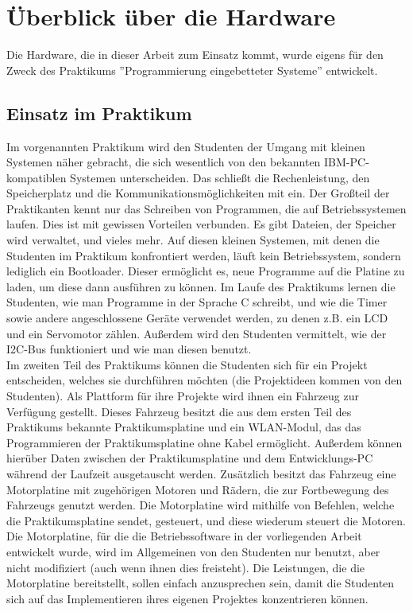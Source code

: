 \chapter{Überblick über die Hardware}
Die Hardware, die in dieser Arbeit zum Einsatz kommt, wurde eigens für den Zweck des Praktikums
''Programmierung eingebetteter Systeme'' entwickelt.

\section{Einsatz im Praktikum}
Im vorgenannten Praktikum wird den Studenten der
Umgang mit kleinen Systemen näher gebracht, die sich wesentlich von den bekannten IBM-PC-kompatiblen
Systemen unterscheiden. Das schließt die Rechenleistung, den Speicherplatz und die
Kommunikationsmöglichkeiten mit ein. 
Der Großteil der Praktikanten kennt nur das Schreiben von Programmen, die auf Betriebssystemen laufen.
Dies ist mit gewissen Vorteilen verbunden. Es gibt
Dateien, der Speicher wird verwaltet, und vieles mehr. Auf diesen kleinen Systemen, mit denen die Studenten im
Praktikum konfrontiert werden, läuft kein Betriebssystem, sondern lediglich ein Bootloader. Dieser
ermöglicht es, neue Programme auf die Platine zu laden, um diese dann ausführen zu können.
Im Laufe des Praktikums lernen die Studenten, wie man Programme in der Sprache C schreibt, und wie die Timer
sowie andere angeschlossene Geräte verwendet werden, zu denen z.B. ein LCD und ein Servomotor zählen.
Außerdem wird den Studenten vermittelt, wie der I2C-Bus funktioniert und wie man diesen benutzt.\\
Im zweiten Teil des Praktikums können die Studenten sich für ein Projekt entscheiden,
welches sie durchführen möchten (die Projektideen kommen von den Studenten).
Als Plattform für ihre Projekte wird ihnen ein Fahrzeug zur Verfügung gestellt. Dieses
Fahrzeug besitzt die aus dem ersten Teil des Praktikums bekannte Praktikumsplatine und ein WLAN-Modul,
das das Programmieren der Praktikumsplatine
ohne Kabel ermöglicht. Außerdem können hierüber Daten zwischen der Praktikumsplatine
und dem Entwicklungs-PC während
der Laufzeit ausgetauscht werden. Zusätzlich besitzt das Fahrzeug eine Motorplatine mit
zugehörigen Motoren und Rädern, die zur Fortbewegung des Fahrzeugs genutzt werden. Die
Motorplatine wird mithilfe von Befehlen, welche die Praktikumsplatine sendet, gesteuert, und
diese wiederum steuert die Motoren.\\
Die Motorplatine, für die die Betriebssoftware in der vorliegenden Arbeit entwickelt wurde, wird
im Allgemeinen von den Studenten nur benutzt, aber nicht modifiziert (auch wenn ihnen dies
freisteht). Die Leistungen, die die Motorplatine bereitstellt, 
sollen einfach anzusprechen sein, damit die Studenten sich auf das Implementieren
ihres eigenen Projektes konzentrieren können.\\


